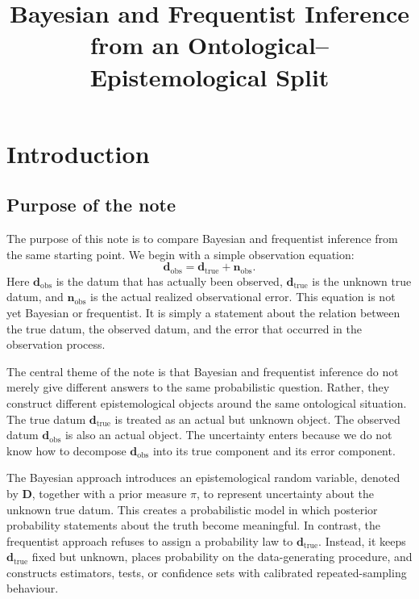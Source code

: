 \documentclass[11pt]{article}
\title{Bayesian and Frequentist Inference from an Ontological--Epistemological Split}
\author{}
\date{}
\newcommand{\prior}{\pi}
\newcommand{\Drand}{\mathbf D}
\newcommand{\dtrue}{\mathbf d_{\mathrm{true}}}
\newcommand{\dobs}{\mathbf d_{\mathrm{obs}}}
\newcommand{\nobs}{\mathbf n_{\mathrm{obs}}}
\begin{document}
\maketitle

\tableofcontents

\newpage

\section{Introduction}

\subsection{Purpose of the note}

The purpose of this note is to compare Bayesian and frequentist inference from the same starting point. We begin with a simple observation equation:
\[
    \dobs=\dtrue+\nobs.
\]
Here \(\dobs\) is the datum that has actually been observed, \(\dtrue\) is the unknown true datum, and \(\nobs\) is the actual realized observational error. This equation is not yet Bayesian or frequentist. It is simply a statement about the relation between the true datum, the observed datum, and the error that occurred in the observation process.

The central theme of the note is that Bayesian and frequentist inference do not merely give different answers to the same probabilistic question. Rather, they construct different epistemological objects around the same ontological situation. The true datum \(\dtrue\) is treated as an actual but unknown object. The observed datum \(\dobs\) is also an actual object. The uncertainty enters because we do not know how to decompose \(\dobs\) into its true component and its error component.

The Bayesian approach introduces an epistemological random variable, denoted by \(\Drand\), together with a prior measure \(\prior\), to represent uncertainty about the unknown true datum. This creates a probabilistic model in which posterior probability statements about the truth become meaningful. In contrast, the frequentist approach refuses to assign a probability law to \(\dtrue\). Instead, it keeps \(\dtrue\) fixed but unknown, places probability on the data-generating procedure, and constructs estimators, tests, or confidence sets with calibrated repeated-sampling behaviour.
\end{document}
